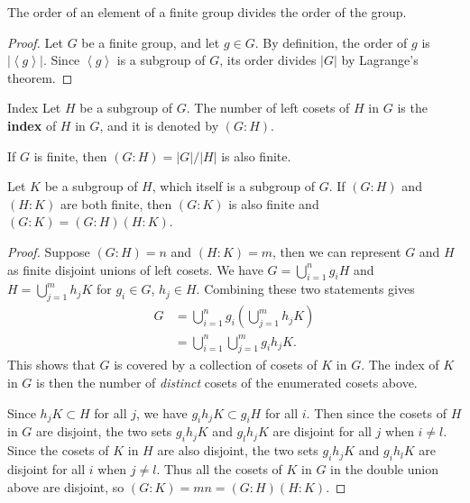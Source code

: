 \documentclass[10pt]{report}
\begin{document}
\begin{cor}
	The order of an element of a finite group divides the order of the group.
\end{cor}
\begin{proof}
	Let $G$ be a finite group, and let $g \in G$. By definition, the order of $g$ is $|\left\langle g \right\rangle|$. Since $\left\langle g \right\rangle$ is a subgroup of $G$, its order divides $|G|$ by Lagrange's theorem.
\end{proof}

\begin{defn}{Index}{}
	Let $H$ be a subgroup of $G$. The number of left cosets of $H$ in $G$ is the \textbf{index} of $H$ in $G$, and it is denoted by $(G:H)$.
\end{defn}

If $G$ is finite, then $(G:H) = |G|/|H|$ is also finite.

\begin{prop}
	Let $K$ be a subgroup of $H$, which itself is a subgroup of $G$. If $(G:H)$ and $(H:K)$ are both finite, then $(G:K)$ is also finite and $(G:K)=(G:H)(H:K)$.
\end{prop}
\begin{proof}
	Suppose $(G:H)=n$ and $(H:K)=m$, then we can represent $G$ and $H$ as finite disjoint unions of left cosets. We have $G = \bigcup_{i=1}^n g_i H$ and $H = \bigcup_{j=1}^m h_j K$ for $g_i \in G$, $h_j\in H$. Combining these two statements gives
	\begin{align*}
		G &= \bigcup_{i=1}^n g_i \left( \bigcup_{j=1}^m h_j K \right) \\
		  &= \bigcup_{i=1}^n \bigcup_{j=1}^m g_i h_j K.
	\end{align*}
	This shows that $G$ is covered by a collection of cosets of $K$ in $G$. The index of $K$ in $G$ is then the number of \textit{distinct} cosets of the enumerated cosets above.

	Since $h_j K \subset H$ for all $j$, we have $g_i h_j K \subset g_i H$ for all $i$. Then since the cosets of $H$ in $G$ are disjoint, the two sets $g_i h_j K$ and $g_l h_j K$ are disjoint for all $j$ when $i \neq l$. Since the cosets of $K$ in $H$ are also disjoint, the two sets $g_i h_j K$ and $g_i h_l K$ are disjoint for all $i$ when $j \neq l$. Thus all the cosets of $K$ in $G$ in the double union above are disjoint, so $(G:K) = m n = (G:H) (H:K)$.
\end{proof}


\end{document}
